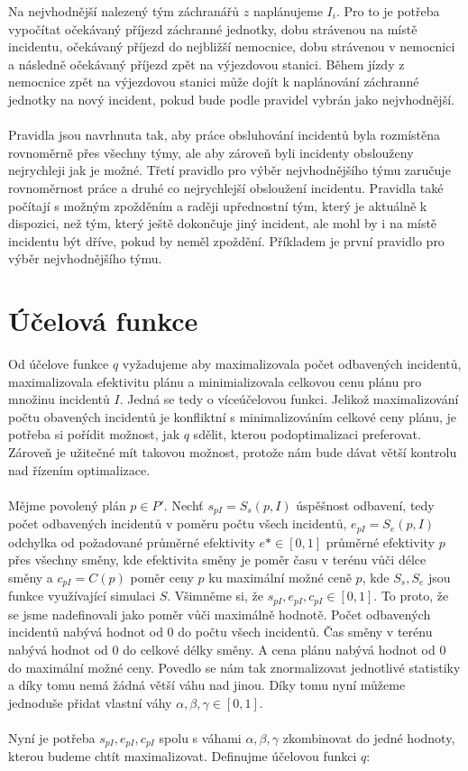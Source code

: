 Na nejvhodnější nalezený tým záchranářů $z$ naplánujeme $I_i$. Pro to je potřeba vypočítat očekávaný příjezd záchranné jednotky, dobu strávenou na místě incidentu, očekávaný příjezd
do nejbližší nemocnice, dobu strávenou v nemocnici a následně očekávaný příjezd zpět na výjezdovou stanici.
Během jízdy z nemocnice zpět na výjezdovou stanici může dojít k naplánování záchranné jednotky na nový incident, pokud bude podle pravidel vybrán jako nejvhodnější.
\\
\\
Pravidla jsou navrhnuta tak, aby práce obsluhování incidentů byla rozmístěna rovnoměrně přes všechny týmy, ale aby zároveň byli incidenty obslouženy nejrychleji jak je možné.
Třetí pravidlo pro výběr nejvhodnějšího týmu zaručuje rovnoměrnost práce a druhé co nejrychlejší obsloužení incidentu.
Pravidla také počítají s možným zpožděním a raději upřednostní tým, který je aktuálně k dispozici, než tým, který ještě dokončuje jiný incident, ale mohl by i na místě incidentu
být dříve, pokud by neměl zpoždění. Příkladem je první pravidlo pro výběr nejvhodnějšího týmu.

\clearpage

\section{Účelová funkce}

Od účelove funkce $q$ vyžadujeme aby maximalizovala počet odbavených incidentů, maximalizovala efektivitu plánu a minimializovala celkovou cenu plánu pro množinu incidentů $I$.
Jedná se tedy o víceúčelovou funkci. Jelikož maximalizování počtu obavených incidentů je konfliktní s minimalizováním celkové ceny plánu, je potřeba si pořídit
možnost, jak $q$ sdělit, kterou podoptimalizaci preferovat. Zároveň je užitečné mít takovou možnost, protože nám bude dávat větší kontrolu nad řízením optimalizace.
\\
\\
Mějme povolený plán $p \in P'$. Nechť $s_{pI} = S_s(p, I)$ úspěšnost odbavení, tedy počet odbavených incidentů v poměru počtu všech incidentů,
$e_{pI} = S_e(p, I)$ odchylka od požadované průměrné efektivity $e* \in [0, 1]$ průměrné efektivity $p$ přes všechny směny,
kde efektivita směny je poměr času v terénu vůči délce směny a $c_{pI} = C(p)$ poměr ceny $p$ ku maximální možné ceně $p$,
kde $S_s, S_e$ jsou funkce využívající simulaci $S$. Všimněme si, že $s_{pI}, e_{pI}, c_{pI} \in [0, 1]$.
To proto, že se jsme nadefinovali jako poměr vůči maximálně hodnotě. Počet odbavených incidentů nabývá hodnot od 0 do počtu všech incidentů.
Čas směny v terénu nabývá hodnot od 0 do celkové délky směny. A cena plánu nabývá hodnot od 0 do maximální možné ceny.
Povedlo se nám tak znormalizovat jednotlivé statistiky a díky tomu nemá žádná větší váhu nad jinou.
Díky tomu nyní můžeme jednoduše přidat vlastní váhy $\alpha, \beta, \gamma \in [0, 1]$.
\\
\\
Nyní je potřeba $s_{pI}, e_{pI}, c_{pI}$ spolu s váhami $\alpha, \beta, \gamma$ zkombinovat do jedné hodnoty, kterou budeme chtít maximalizovat.
Definujme účelovou funkci $q$:

